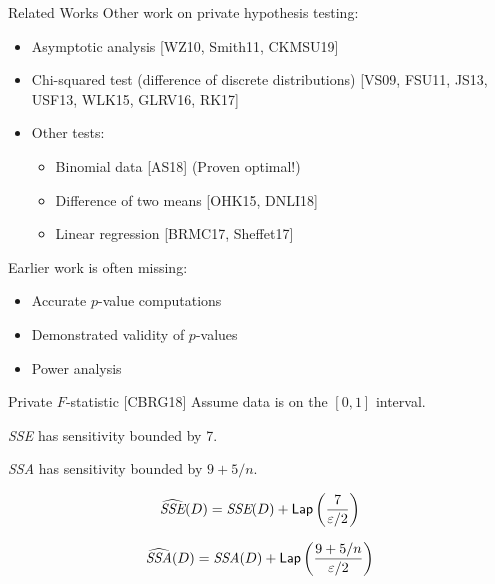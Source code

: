 \documentclass{beamer}
\newcommand{\sse}{\textit{SSE}\xspace}
\newcommand{\ssa}{\textit{SSA}\xspace}
\newcommand{\lap}{\ensuremath{{\sf Lap}}\xspace}
\begin{document}
\begin{frame}{Related Works}
    Other work on private hypothesis testing:\pause
\begin{itemize}
\item Asymptotic analysis [WZ10, Smith11, CKMSU19] \pause
\item Chi-squared test (difference of discrete distributions) [VS09, FSU11, JS13, USF13, WLK15, GLRV16, RK17] \pause
\item Other tests: \pause
\begin{itemize}
\item Binomial data [AS18] (Proven optimal!) \pause
\item Difference of two means [OHK15, DNLI18] \pause
\item Linear regression [BRMC17, Sheffet17] \pause
\end{itemize}
\end{itemize}
Earlier work is often missing: \pause
\begin{itemize}
\item Accurate $p$-value computations \pause
\item Demonstrated validity of $p$-values \pause
\item Power analysis
\end{itemize}
\end{frame}

\begin{frame}{Private $F$-statistic [CBRG18]}
\pause
Assume data is on the $[0,1]$ interval. \pause
\begin{theorem}
\sse has sensitivity bounded by 7.
\end{theorem}
\begin{theorem}
\ssa has sensitivity bounded by $9 + 5/n$.
\end{theorem}
\pause
$$\widehat{\sse}(D) = \sse(D) + \lap\left(\frac{7}{\varepsilon/2}\right) $$

$$\widehat{\ssa}(D) = \ssa(D) + \lap\left(\frac{9+5/n}{\varepsilon/2}\right) $$ 
\end{frame}
\end{document}
